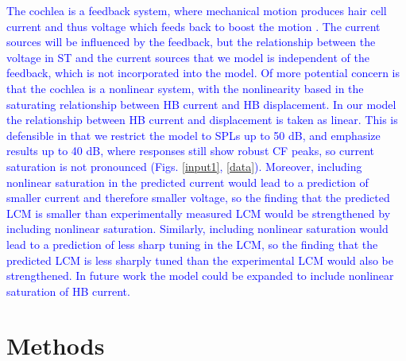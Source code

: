 \documentclass{biophys-new}
\begin{document}
\par{\textcolor{blue}{The cochlea is a feedback system, where mechanical motion produces hair cell current and thus voltage which feeds back to boost the motion \cite{olson2020}. The current sources will be influenced by the feedback, but the relationship between the voltage in ST and the current sources that we model is independent of the feedback, which is not incorporated into the model.  Of more potential concern is that the cochlea is a nonlinear system, with the nonlinearity based in the saturating relationship between HB current and HB displacement.  In our model the relationship between HB current and displacement is taken as linear.  This is defensible in that we restrict the model to SPLs up to 50 dB, and emphasize results up to 40 dB, where responses still show robust CF peaks, so current saturation is not pronounced (Figs. \ref{input1}, \ref{data}).  Moreover, including nonlinear saturation in the predicted current would lead to a prediction of smaller current and therefore smaller voltage, so the finding that the predicted LCM is smaller than experimentally measured LCM would be strengthened by including nonlinear saturation.  Similarly, including nonlinear saturation would lead to a prediction of less sharp tuning in the LCM, so the finding that the predicted LCM is less sharply tuned than the experimental LCM would also be strengthened. In future work the model could be expanded to include nonlinear saturation of HB current.}}

\section{Methods}
\end{document}

